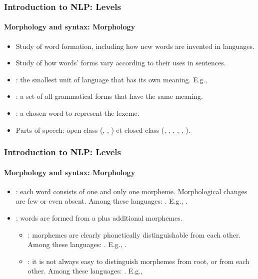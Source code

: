 \documentclass[xcolor=table]{beamer}
\begin{document}
\begin{frame}
\frametitle{Introduction to NLP: Levels}
\framesubtitle{Morphology and syntax: Morphology}

\begin{itemize}
	\item Study of word formation, including how new words are invented in languages.
	\item Study of how words' forms vary according to their uses in sentences.
	\item {}: the smallest unit of language that has its own meaning. 
	E.g., 
	\item {}: a set of all grammatical forms that have the same meaning.
	\item {}: a chosen word to represent the lexeme.
	\item Parts of speech: open class (, , ) et closed class (, , , ,  , ).
\end{itemize}

\end{frame}


\begin{frame}
\frametitle{Introduction to NLP: Levels}
\framesubtitle{Morphology and syntax: Morphology}

\begin{itemize}
	\item {}: each word consists of one and only one morpheme. 
	Morphological changes are few or even absent.
	Among these languages: . 
	E.g., .
	\item {}: words are formed from a  plus additional morphemes.
	\begin{itemize}
		\item {}: morphemes are clearly phonetically distinguishable from each other.
		Among these languages: . 
		E.g., .
		\item {}: it is not always easy to distinguish morphemes from root, or from each other.
		Among these languages: .
		E.g., 
	\end{itemize}
\end{itemize}

\end{frame}
\end{document}
